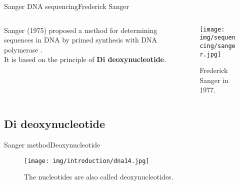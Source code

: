 \documentclass[10pt]{beamer}
\newcommand{\1}{
	\setbeamertemplate{background}{
		\texttt{[image: img/1]}
		\tikz[overlay] \fill[fill opacity=0.75,fill=white] (0,0) rectangle (-\paperwidth,\paperheight);
	}
}
\begin{document}
\begin{frame}{Sanger DNA sequencing}{Frederick Sanger}
	
		\begin{columns}
			\begin{column}{0.48\textwidth}
				\begin{block}{}
					Sanger (1975) proposed a method for determining sequences in DNA by primed synthesis with DNA polymerase \cite{sanger1977dna}. \\ 
					It is based on the principle of \textbf{Di deoxynucleotide}.
				\end{block} 
			\end{column}
			\begin{column}{0.48\textwidth}
				\begin{figure}[]
					\centering
					\texttt{[image: img/sequencing/sanger.jpg]}
					\label{img:mot2}
					\caption{Frederick Sanger in 1977.}
				\end{figure}
			\end{column}
		\end{columns}	
\end{frame}

\subsection{Di deoxynucleotide}


\begin{frame}{Sanger method}{Deoxynucleotide}
	\begin{figure}[]
		\centering
		\texttt{[image: img/introduction/dna14.jpg]}
		\label{img:mot2}
		\caption{The nucleotides are also called deoxynucleotides.}
	\end{figure}
\end{frame}
\end{document}
